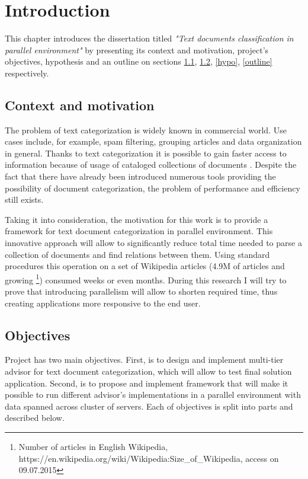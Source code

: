 \chapter{Introduction}
\label{int}

This chapter introduces the dissertation titled \textit{"Text documents classification in parallel environment"} by presenting its context and motivation, project’s objectives, hypothesis and an outline on sections \ref{con_mon}, \ref{obj}, \ref{hypo}, \ref{outline} respectively.

\section{Context and motivation}
\label{con_mon}
The problem of text categorization is widely known in commercial world. Use cases include, for example, spam filtering, grouping articles and data organization in general. Thanks to text categorization it is possible to gain faster access to information because of usage of cataloged collections of documents \cite{aut_wiki_cat_8}. Despite the fact that there have already been introduced numerous tools providing the possibility of document categorization, the problem of performance and efficiency still exists.

Taking it into consideration, the motivation for this work is to provide a framework for text document categorization in parallel environment. This innovative approach will allow to significantly reduce total time needed to parse a collection of documents and find relations between them. Using standard procedures this operation on a set of Wikipedia articles (4.9M of articles and growing \cite{wiki_art_num} \footnote{Number of articles in English Wikipedia, https://en.wikipedia.org/wiki/Wikipedia:Size\_of\_Wikipedia, access on 09.07.2015}) consumed weeks or even months. During this research I will try to prove that introducing parallelism will allow to shorten required time, thus creating applications more responsive to the end user.

\section{Objectives}
\label{obj}
Project has two main objectives. First, is to design and implement multi-tier advisor for text document categorization, which will allow to test final solution application. Second, is to propose and implement framework that will make it possible to run different advisor's implementations in a parallel environment with data spanned across cluster of servers. Each of objectives is split into parts and described below.

